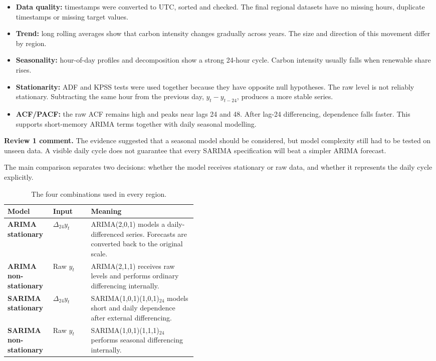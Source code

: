 \documentclass[10pt,a4paper]{article}
\makeatletter
\renewcommand\section{\@startsection{section}{1}{0pt}{8pt}{4pt}{\large\bfseries\color{navy}}}
\makeatother
\begin{document}
\begin{itemize}
  \item \textbf{Data quality:} timestamps were converted to UTC, sorted and checked. The final regional datasets have no missing hours, duplicate timestamps or missing target values.
  \item \textbf{Trend:} long rolling averages show that carbon intensity changes gradually across years. The size and direction of this movement differ by region.
  \item \textbf{Seasonality:} hour-of-day profiles and decomposition show a strong 24-hour cycle. Carbon intensity usually falls when renewable share rises.
  \item \textbf{Stationarity:} ADF and KPSS tests were used together because they have opposite null hypotheses. The raw level is not reliably stationary. Subtracting the same hour from the previous day, $y_t-y_{t-24}$, produces a more stable series.
  \item \textbf{ACF/PACF:} the raw ACF remains high and peaks near lags 24 and 48. After lag-24 differencing, dependence falls faster. This supports short-memory ARIMA terms together with daily seasonal modelling.
\end{itemize}

\textbf{Review 1 comment.} The evidence suggested that a seasonal model should be considered, but model complexity still had to be tested on unseen data. A visible daily cycle does not guarantee that every SARIMA specification will beat a simpler ARIMA forecast.

\newpage

\section{Four Required Model Designs}

The main comparison separates two decisions: whether the model receives stationary or raw data, and whether it represents the daily cycle explicitly.

\begin{table}[h]
\centering
\small
\begin{tabularx}{\linewidth}{>{\bfseries}p{0.24\linewidth} p{0.20\linewidth} X}
\toprule
Model & Input & Meaning \\
\midrule
ARIMA stationary & $\Delta_{24}y_t$ & ARIMA(2,0,1) models a daily-differenced series. Forecasts are converted back to the original scale. \\
ARIMA non-stationary & Raw $y_t$ & ARIMA(2,1,1) receives raw levels and performs ordinary differencing internally. \\
SARIMA stationary & $\Delta_{24}y_t$ & SARIMA(1,0,1)(1,0,1)$_{24}$ models short and daily dependence after external differencing. \\
SARIMA non-stationary & Raw $y_t$ & SARIMA(1,0,1)(1,1,1)$_{24}$ performs seasonal differencing internally. \\
\bottomrule
\end{tabularx}
\caption{The four combinations used in every region.}
\end{table}
\end{document}
